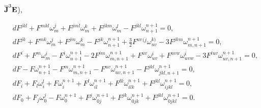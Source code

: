 $\overline{\bold J}^3\bold E$), 


\begin{align*} 


& dF^{jkl}+F^{mkl}\omega^j_m+F^{jml}\omega^k_m+ 


F^{jkm}\omega^l_m-F^{jkl}\omega^{n+1}_{n+1}=0,\\ 


%


& dF^{jk}+F^{mk}\omega^j_m+F^{jm}\omega^k_m- 


F^{jk}\omega^{n+1}_{n+1}+\tfrac{3}{2}F^{uv}{}^{(j}\omega^{k)}_{uv}- 


3F^{jkm}\omega^{n+1}_{m,n+1}=0,\\ 


%


& dF^i+F^m\omega^i_m-F^i\omega^{n+1}_{n+1}- 


2F^{im}\omega^{n+1}_{m,n+1}+ 


F^{uv}\omega^i_{uv}+F^{uvw}\omega^i_{uvw}- 


3F^{iuv}\omega^{n+1}_{uv,n+1}=0,\\ 


%


& dF-F\omega^{n+1}_{n+1}-F^m\omega^{n+1}_{m,n+1}- 


F^{uv}\omega^{n+1}_{uv,n+1}-F^{jkl}\omega^{n+1}_{jkl,n+1}=0,\\ 


%


& dF_i+F_l\omega^l_i+F\omega^{n+1}_i+F^l\omega^{n+1}_{il}+ 


F^{lk}\omega^{n+1}_{ilk}+F^{jkl}\omega^{n+1}_{ijkl}=0,\\ 


%


& dF_0+F_j\omega^j_0-F\omega^{n+1}_0+F^j\omega^{n+1}_{0j}+ 


F^{jk}\omega^{n+1}_{0jk}+F^{jkl}\omega^{n+1}_{0jkl}=0. 


\end{align*} 


 


